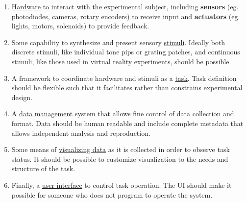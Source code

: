 \begin{enumerate}

\item \hyperref[sec:hardware]{Hardware} to interact with the experimental subject, including \textbf{sensors} (eg. photodiodes, cameras, rotary encoders) to receive input and \textbf{actuators} (eg. lights, motors, solenoids) to provide feedback.
\item Some capability to synthesize and present sensory \hyperref[sec:stim]{stimuli}. Ideally both discrete stimuli, like individual tone pips or grating patches, and continuous stimuli, like those used in virtual reality experiments, should be possible.
\item A  framework to coordinate hardware and stimuli as a \hyperref[sec:tasks]{task}. Task definition should be flexible such that it facilitates rather than constrains experimental design.
\item A \hyperref[sec:data]{data management} system that allows fine control of data collection and format. Data should be human readable and include complete metadata that allows independent analysis and reproduction.
\item Some means of \hyperref[sec:plotting]{visualizing data} as it is collected in order to  observe task status. It should be possible to customize visualization to the needs and structure of the task.
\item Finally, a \hyperref[sec:ui]{user interface} to control task operation. The UI should make it possible for someone who does not program to operate the system.
\end{enumerate}

